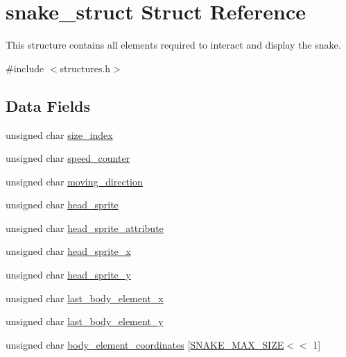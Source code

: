 \hypertarget{structsnake__struct}{}\section{snake\+\_\+struct Struct Reference}
\label{structsnake__struct}


This structure contains all elements required to interact and display the snake.  




{\ttfamily \#include $<$structures.\+h$>$}

\subsection*{Data Fields}
\begin{DoxyCompactItemize}
\item 
unsigned char \hyperlink{structsnake__struct_a908b761eeaa385c331d29721c74fbd56}{size\+\_\+index}
\item 
unsigned char \hyperlink{structsnake__struct_a5b4861c8a096bac3fcc718c702265fb2}{speed\+\_\+counter}
\item 
unsigned char \hyperlink{structsnake__struct_aab0070520b89a005e175de518bbf8d76}{moving\+\_\+direction}
\item 
unsigned char \hyperlink{structsnake__struct_afebbff4a86a6b768aa89eb81da9b0611}{head\+\_\+sprite}
\item 
unsigned char \hyperlink{structsnake__struct_aee3e536edc6d71b7578c751509573500}{head\+\_\+sprite\+\_\+attribute}
\item 
unsigned char \hyperlink{structsnake__struct_aded972bf189fa5a28e09cf0a71f59e6e}{head\+\_\+sprite\+\_\+x}
\item 
unsigned char \hyperlink{structsnake__struct_af868f2fa25f812bc8d05bce98fdc964b}{head\+\_\+sprite\+\_\+y}
\item 
unsigned char \hyperlink{structsnake__struct_a412e4ee1c9bc5e1128912fecb8f3f74a}{last\+\_\+body\+\_\+element\+\_\+x}
\item 
unsigned char \hyperlink{structsnake__struct_a058ae4f8fa7ee37be988277b1a231a6f}{last\+\_\+body\+\_\+element\+\_\+y}
\item 
unsigned char \hyperlink{structsnake__struct_a951e67290252c2a8d5ed463ce30d2743}{body\+\_\+element\+\_\+coordinates} \mbox{[}\hyperlink{macros_8h_a6fb1d4c78b46a621cb8344c51adcdc02}{S\+N\+A\+K\+E\+\_\+\+M\+A\+X\+\_\+\+S\+I\+ZE}$<$$<$ 1\mbox{]}
\end{DoxyCompactItemize}


